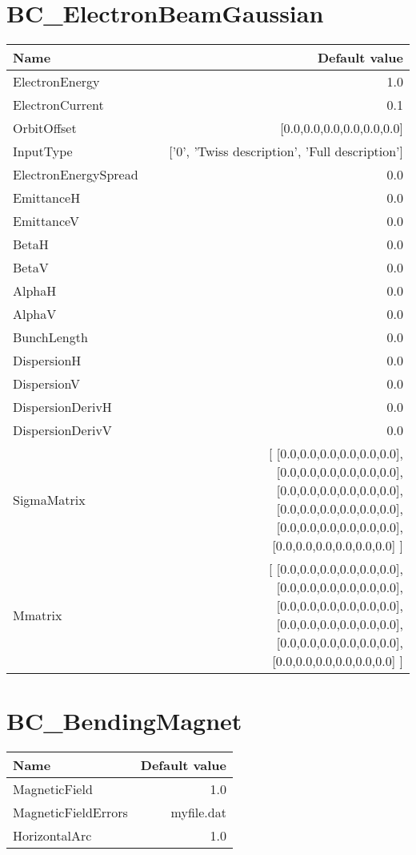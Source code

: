 \documentclass{article}
\begin{document}
\section{BC\_ElectronBeamGaussian}
\begin{tabular}{lr}
Name & Default value \\
\hline
ElectronEnergy & 1.0 \\
ElectronCurrent & 0.1 \\
OrbitOffset & [0.0,0.0,0.0,0.0,0.0,0.0] \\
InputType & ['0', 'Twiss description', 'Full description'] \\
ElectronEnergySpread & 0.0 \\
EmittanceH & 0.0 \\
EmittanceV & 0.0 \\
BetaH & 0.0 \\
BetaV & 0.0 \\
AlphaH & 0.0 \\
AlphaV & 0.0 \\
BunchLength & 0.0 \\
DispersionH & 0.0 \\
DispersionV & 0.0 \\
DispersionDerivH & 0.0 \\
DispersionDerivV & 0.0 \\
SigmaMatrix & [ [0.0,0.0,0.0,0.0,0.0,0.0],                            [0.0,0.0,0.0,0.0,0.0,0.0],                            [0.0,0.0,0.0,0.0,0.0,0.0],                            [0.0,0.0,0.0,0.0,0.0,0.0],                            [0.0,0.0,0.0,0.0,0.0,0.0],                            [0.0,0.0,0.0,0.0,0.0,0.0] ] \\
Mmatrix & [ [0.0,0.0,0.0,0.0,0.0,0.0],                            [0.0,0.0,0.0,0.0,0.0,0.0],                            [0.0,0.0,0.0,0.0,0.0,0.0],                            [0.0,0.0,0.0,0.0,0.0,0.0],                            [0.0,0.0,0.0,0.0,0.0,0.0],                            [0.0,0.0,0.0,0.0,0.0,0.0] ] \\
   
\end{tabular}



\section{BC\_BendingMagnet}
\begin{tabular}{lr}
Name & Default value \\
\hline
MagneticField & 1.0 \\
MagneticFieldErrors & myfile.dat \\
HorizontalArc & 1.0 \\
   
\end{tabular}
\end{document}
